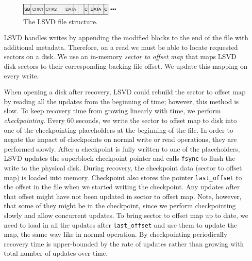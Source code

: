 \begin{figure}[h]
    \includegraphics[width=0.45\textwidth]{./figures/lsvd.pdf}
    \caption{The LSVD file structure.}
    \label{fig:lsvd}
\end{figure}

LSVD handles writes by appending the modified blocks to the end of the file with additional metadata. Therefore, on a read we must be able to locate requested sectors on a disk. We use an in-memory \emph{sector to offset map} that maps LSVD disk sectors to their corresponding backing file offset. We update this mapping on every write.

When opening a disk after recovery, LSVD could rebuild the sector to offset map by reading all the updates from the beginning of time; however, this method is slow. To keep recovery time from growing linearly with time, we perform \emph{checkpointing}. Every 60 seconds, we write the sector to offset map to disk into one of the checkpointing placeholders at the beginning of the file. In order to negate the impact of checkpoints on normal write or read operations, they are performed slowly. After a checkpoint is fully written to one of the placeholders, LSVD updates the superblock checkpoint pointer and calls \texttt{fsync} to flush the write to the physical disk. During recovery, the checkpoint data (sector to offset map) is loaded into memory. Checkpoint also stores the pointer \texttt{last\_offset} to the offset in the file when we started writing the checkpoint. Any updates after that offset might have not been updated in sector to offset map. Note, however, that some of they might be in the checkpoint, since we perform checkpointing slowly and allow concurrent updates. To bring sector to offset map up to date, we need to load in all the updates after \texttt{last\_offset} and use them to update the map, the same way like in normal operation. By checkpointing periodically recovery time is upper-bounded by the rate of updates rather than growing with total number of updates over time.

